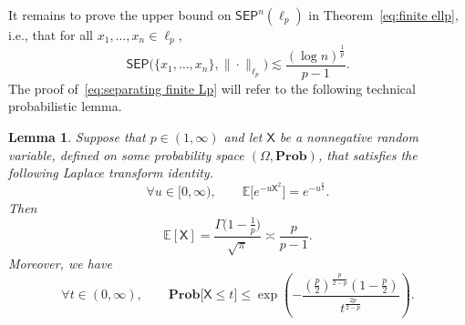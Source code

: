 \documentclass[11pt,reqno]{amsart}
\renewcommand{\le}{\leqslant}
\newtheorem{lemma}[theorem]{Lemma}
\theoremstyle{remark}
\newcommand{\E}{\mathbb{ E}}
\renewcommand{\Pr}{\mathbf{Prob}}
\renewcommand{\1}{\mathbf 1}
\newcommand{\sep}{\mathsf{SEP}}
\newcommand{\XX}{\mathsf{X}}
\begin{document}
It remains to prove the upper bound on $\sep^n(\ell_p)$ in Theorem~\ref{eq:finite ellp}, i.e., that for all $x_1,\ldots,x_n\in \ell_p$,
\begin{equation}\label{eq:separating finite Lp}
\sep\big(\{x_1,\ldots,x_n\},\|\cdot\|_{\ell_p}\big)\lesssim \frac{(\log n)^{\frac{1}{p}}}{p-1}.
\end{equation}
The proof of~\eqref{eq:separating finite Lp} will refer to the following technical probabilistic lemma.
\begin{lemma}\label{lem:laplace} Suppose that $p\in (1,\infty)$ and let $\XX$ be a nonnegative random variable, defined on some probability space $(\Omega,\Pr)$, that satisfies the following Laplace transform identity.
\begin{equation}\label{eq:laplace}
\forall  u\in [0,\infty),\qquad \E\Big[e^{-u\XX^2}\Big]=e^{-u^{\frac{p}{2}}}.
\end{equation}
Then
\begin{equation}\label{eq:expectation X}
\E[\XX]=\frac{\Gamma\big(1-\frac{1}{p}\big)}{\sqrt{\pi}}\asymp \frac{p}{p-1}.
\end{equation}
Moreover, we have
\begin{equation}\label{eq:small ball}
\forall  t\in (0,\infty),\qquad \Pr\big[\XX\le t\big]\le \exp\left(-\frac{\left(\frac{p}{2}\right)^{\frac{p}{2-p}}\left(1-\frac{p}{2}\right)}{t^{\frac{2p}{2-p}}}\right).
\end{equation}
\end{lemma}
\end{document}
